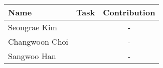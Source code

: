 \begin{table}[h!]
    \centering
    \begin{tabular}{l|c|c}
        \toprule
        Name & Task & Contribution\\
        \midrule
        Seongrae Kim& & -\\
        Changwoon Choi& & -\\
        Sangwoo Han& & -\\
        \bottomrule
    \end{tabular}
\end{table}